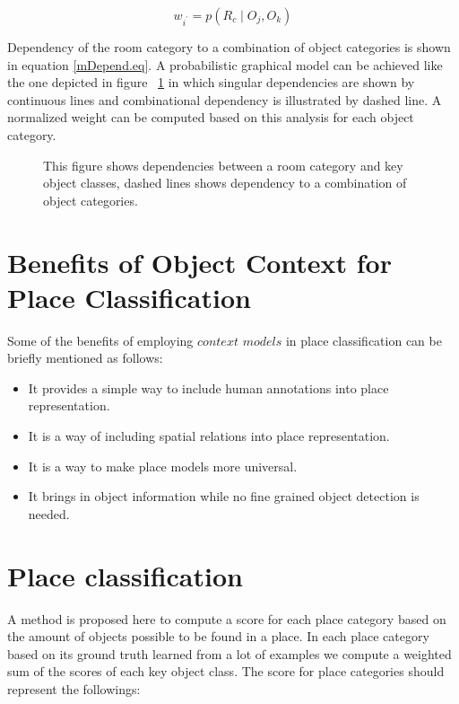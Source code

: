 \begin{equation}
 \label{mDepend.eq}
 w_{i^{'}} = p(R_c \mid O_j,O_k)
\end{equation}

Dependency of the room category to a combination of object categories is shown in equation \ref{mDepend.eq}. 
A probabilistic graphical model can be achieved like the one depicted in figure ~\ref{RoomObjectDepend.figure} in which
singular dependencies are shown by continuous lines and combinational dependency is illustrated by dashed line.
A normalized weight can be computed based on this analysis for each object category.  

 \begin{figure}[t]
  \caption[Probabilistic graphical model of place-object.]
  {This figure shows dependencies between a room category and key object classes, dashed lines shows dependency to a combination of object categories.}
  \label{RoomObjectDepend.figure}
\end{figure}

 
\section{Benefits of Object Context for Place Classification}
\label{BenefitsofObjectContextforPlaceClassification.sec}
Some of the benefits of employing $context$ $models$ in place classification can be briefly mentioned as follows: 
\begin{itemize}
 \item It provides a simple way to include human annotations into place representation.
 \item It is a way of including spatial relations into place representation.
 \item It is a way to make place models more universal.
 \item It brings in object information while no fine grained object detection is needed.
\end{itemize}


\section{Place classification}
\label{Place classification.sec}
A method is proposed here to compute a score for each place category based on the amount of objects possible to be
found in a place. 
In each place category based on its ground truth learned from a lot of examples we compute a weighted sum of the 
scores of each key object class.
The score for place categories should represent the followings:

